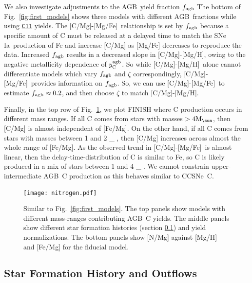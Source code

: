 \documentclass[fleqn,
usenatbib]{mnras}
\newcommand{\cxi}{\texttt{\hyperlink{C11}{C11}}}
\newcommand{\agb}{AGB}
\newcommand{\cc}{CCSNe}
\newcommand{\ia}{SNe Ia}
\newcommand{\caah}{[C/Mg]-[Mg/H]}
\newcommand{\caafe}{[C/Mg]-[Mg/Fe]}
\newcommand{\Ycagb}{\ensuremath{y_{\rm C}^{\rm agb}}}
\newcommand{\Mo}{%
    \ifmmode {\rm M}_{\sun}%
    \else {M$_{\sun}$}%
    \fi}
\begin{document}
We also investigate adjustments to the \agb\ yield fraction $f_{\rm agb}$
The bottom of Fig.~\ref{fig:first_models} shows three models with different \agb\ fractions while using \cxi{} yields.  The \caafe~relationship is set by $f_{\rm agb}$ because a specific amount of C must be released at a delayed time to match the \ia\ production of Fe and increase [C/Mg] as [Mg/Fe] decreases to reproduce the data.
Increased $f_{\rm agb}$ results in a decreased slope in \caah, owing to the negative metallicity dependence of $\Ycagb$. So while \caah~alone cannot differentiate models which vary $f_{\rm agb}$ and $\zeta$ correspondingly, \caafe~provides information on $f_{\rm agb}$. So, we can use \caafe~to estimate $f_{\rm agb}\approx 0.2$, and then choose $\zeta$ to match \caah.


Finally, in the top row of Fig.~\ref{fig:second_models}, we plot FINISH where C production occurs in different mass ranges. If all C comes from stars with masses $>4\Mo$, then [C/Mg] is almost independent of [Fe/Mg]. On the other hand, if all C comes from stars with masses between 1 and 2 \Mo, then [C/Mg] increases across almost the whole range of [Fe/Mg]. As the observed trend in \caafe\ is almost linear, then the delay-time-distribution of C is similar to Fe, so C is likely produced in a mix of stars between 1 and 4\Mo. We cannot constrain upper-intermediate \agb\ C production as this behaves similar to \cc\ C.



\begin{figure}
\centering
\texttt{[image: nitrogen.pdf]}

\caption[]{Similar to Fig.~\ref{fig:first_models}. The top panels show models with different mass-ranges contributing \agb\ C yields. The middle panels show different star formation histories (section \ref{sec:sfh}) and yield normalizations. The bottom panels show [N/Mg] against [Mg/H] and [Fe/Mg] for the fiducial model.
}
\label{fig:second_models}
\end{figure}





\subsection{Star Formation History and Outflows} \label{sec:sfh}
\end{document}
